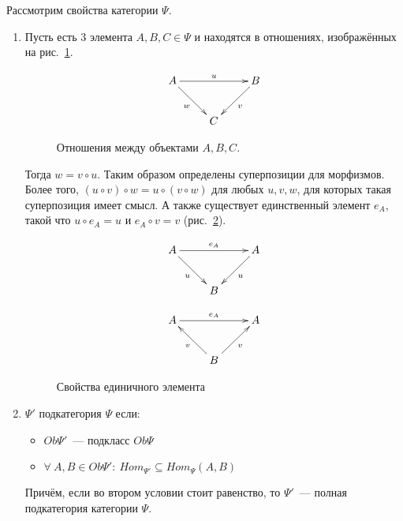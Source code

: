 \documentclass[a4paper, 12pt]{report}
\begin{document}
Рассмотрим свойства категории $\Psi$.
\begin{enumerate}
  \item Пусть есть 3 элемента $A, B, C \in \Psi$ и находятся в отношениях, изображённых на рис.~\ref{fig::property_1}.
\begin{figure}[!htbp]
\begin{equation*}
\xymatrix{
A\ar[rr]^u\ar[rd]_w & & B\ar[ld]^v\\
 & C &
}
\end{equation*}
\caption{Отношения между объектами $A,B,C$.}
\label{fig::property_1}
\end{figure}

Тогда $w = v \circ u$. Таким образом определены суперпозиции для морфизмов. Более того, $(u \circ v) \circ w = u \circ (v \circ w)$ для любых $u, v, w$, для которых такая суперпозиция имеет смысл. А также существует единственный элемент $e_A$, такой что $u \circ e_A = u$ и $e_A \circ v = v$ (рис.~\ref{fig::identity}).
\begin{figure}[!htbp]
\begin{center}
\begin{minipage}[h]{0,45\linewidth}
\begin{equation*}
\xymatrix{
A\ar[rr]^{e_A}\ar[rd]_u & & A\ar[ld]^u\\
 & B &
}
\end{equation*}
\end{minipage}
\begin{minipage}[h]{0.45\linewidth}
\begin{equation*}
\xymatrix{
A\ar[rr]^{e_A} & & A\\
 & B\ar[ru]_v\ar[lu]^v &
}
\end{equation*}
\end{minipage}
\end{center}
\caption{Свойства единичного элемента}
\label{fig::identity}
\end{figure}
\item $\Psi'$ подкатегория $\Psi$ если:
\begin{itemize}
\item $Ob\Psi'$~--- подкласс $Ob\Psi$
\item $\forall\ A, B \in Ob\Psi':\ Hom_{\Psi'} \subseteq Hom_{\Psi} (A, B)$
\end{itemize}
Причём, если во втором условии стоит равенство, то $\Psi'$~--- полная подкатегория категории $\Psi$.
\end{enumerate}
\end{document}

